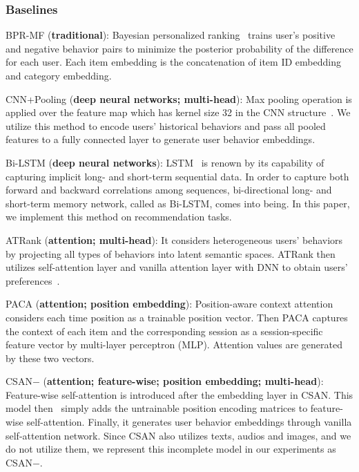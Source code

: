 \documentclass[preprint,12pt]{elsarticle}
\begin{document}
\begin{sloppypar}
\subsubsection{Baselines}

BPR-MF (\textbf{traditional}): Bayesian personalized ranking~\cite{rendle2009bpr} trains user's positive and negative behavior pairs to minimize the posterior probability of the difference for each user. Each item embedding is the concatenation of item ID embedding and category embedding.

CNN+Pooling (\textbf{deep neural networks; multi-head}): Max pooling operation is applied over the feature map which has kernel size 32 in the CNN structure~\cite{zheng2017joint}. We utilize this method to encode users' historical behaviors and pass all pooled features to a fully connected layer to generate user behavior embeddings.

Bi-LSTM (\textbf{deep neural networks}): LSTM~\cite{jozefowicz2015empirical} is renown by its capability of capturing implicit long- and short-term sequential data. In order to capture both forward and backward correlations among sequences, bi-directional long- and short-term memory network, called as Bi-LSTM, comes into being. In this paper, we implement this method on recommendation tasks.

ATRank (\textbf{attention; multi-head}): It considers heterogeneous users' behaviors by projecting all types of behaviors into latent semantic spaces. ATRank then utilizes self-attention layer and vanilla attention layer with DNN to obtain users' preferences~\cite{zhou2018atrank}.

PACA (\textbf{attention; position embedding}): Position-aware context attention~\cite{cao2020position} considers each time position as a trainable position vector. Then PACA captures the context of each item and the corresponding session as a session-specific feature vector by multi-layer perceptron (MLP). Attention values are generated by these two vectors.

CSAN$-$ (\textbf{attention; feature-wise; position embedding; multi-head}): Feature-wise self-attention is introduced after the embedding layer in CSAN. This model then~\cite{huang2018csan} simply adds the untrainable position encoding matrices to feature-wise self-attention. Finally, it generates user behavior embeddings through vanilla self-attention network. Since CSAN also utilizes texts, audios and images, and we do not utilize them, we represent this incomplete model in our experiments as CSAN$-$.


\end{sloppypar}
\end{document}
